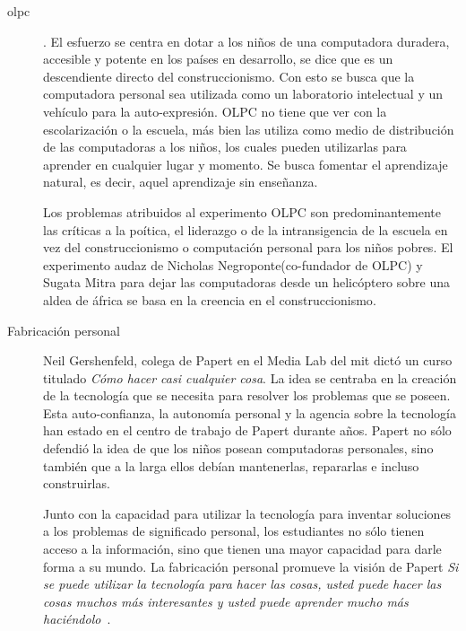 \begin{description}


\item[\Gls{olpc}]. El esfuerzo se centra en dotar a los niños de una computadora
	duradera, accesible y potente en los países en desarrollo, se dice que
	es un descendiente directo del construccionismo. Con esto se busca que
	la computadora personal sea utilizada como un laboratorio intelectual y
	un vehículo para la auto-expresión. OLPC no tiene que ver con la
	escolarización o la escuela, más bien las utiliza como medio de
	distribución de las computadoras a los niños, los cuales pueden
	utilizarlas para aprender en cualquier lugar y momento. Se busca
	fomentar el aprendizaje natural, es decir, aquel aprendizaje sin
	enseñanza.

	Los problemas atribuidos al experimento OLPC son predominantemente las
	críticas a la poítica, el liderazgo	o de la intransigencia de la
	escuela en vez del construccionismo o computación personal para los
	niños pobres. El experimento audaz de Nicholas Negroponte(co-fundador de
	OLPC) y Sugata Mitra para dejar las computadoras desde un helicóptero
	sobre una aldea de áfrica se basa en la creencia en el
	construccionismo\cite{papertian:const}.

\item[Fabricación personal] Neil Gershenfeld, colega de Papert en el Media Lab
	del \Gls{mit} dictó un curso titulado \emph{Cómo hacer casi cualquier
		cosa}. La idea se centraba en la creación de  la tecnología que
	se necesita para resolver los problemas que se poseen. Esta
	auto-confianza, la autonomía personal y la agencia sobre la tecnología
	han estado en el centro de trabajo de Papert durante años. Papert no
	sólo defendió la idea de que los niños posean computadoras personales,
	sino también que a la larga ellos debían mantenerlas, repararlas e
	incluso construirlas.

	Junto con la capacidad para utilizar la tecnología para inventar
	soluciones a los problemas de significado personal, los estudiantes no
	sólo tienen acceso a la información, sino que tienen una mayor capacidad
	para darle forma a su mundo. La fabricación personal promueve la visión
	de Papert \emph{Si se puede utilizar la tecnología para hacer las cosas,
		usted puede hacer las cosas muchos más interesantes y usted
		puede aprender mucho más haciéndolo}~\cite{papertian:const}.

\end{description}

